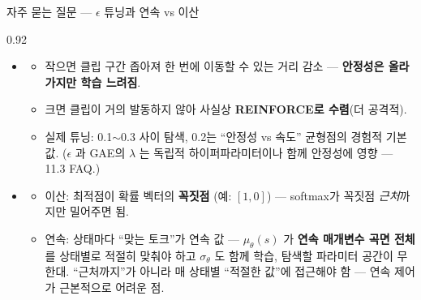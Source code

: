 \begin{frame}{자주 묻는 질문 — $\epsilon$ 튜닝과 연속 vs 이산}
\begin{center}\begin{varwidth}{0.92\textwidth}
  \small
  \begin{itemize}
    \item {}
      \begin{itemize}
        \item 작으면 클립 구간 좁아져 한 번에 이동할 수 있는
          거리 감소 — \textbf{안정성은 올라가지만 학습 느려짐}.
        \item 크면 클립이 거의 발동하지 않아 사실상
          \textbf{REINFORCE로 수렴}(더 공격적).
        \item 실제 튜닝: 0.1$\sim$0.3 사이 탐색, 0.2는
          ``안정성 vs 속도'' 균형점의 경험적 기본값.
          ($\epsilon$ 과 GAE의 $\lambda$ 는 독립적
          하이퍼파라미터이나 함께 안정성에 영향 — 11.3 FAQ.)
      \end{itemize}
    \item {}
      \begin{itemize}
        \item 이산: 최적점이 확률 벡터의 \textbf{꼭짓점}
          (예: $[1,0]$) — softmax가 꼭짓점 \textit{근처}까지만
          밀어주면 됨.
        \item 연속: 상태마다 ``맞는 토크''가 연속 값 —
          $\mu_\theta(s)$ 가 \textbf{연속 매개변수 곡면 전체}를
          상태별로 적절히 맞춰야 하고 $\sigma_\theta$ 도 함께
          학습, 탐색할 파라미터 공간이 무한대. ``근처까지''가
          아니라 매 상태별 ``적절한 값''에 접근해야 함 —
          연속 제어가 근본적으로 어려운 점.
      \end{itemize}
  \end{itemize}
\end{varwidth}\end{center}
\end{frame}
